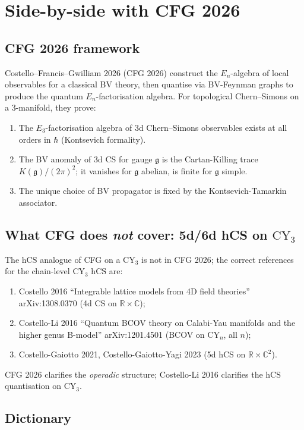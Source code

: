 \documentclass[11pt]{article}
\providecommand{\CY}{\mathrm{CY}}
\providecommand{\hCS}{\mathrm{hCS}}
\providecommand{\fg}{\mathfrak{g}}
\providecommand{\RR}{\mathbb{R}}
\providecommand{\CC}{\mathbb{C}}
\begin{document}
\section{Side-by-side with CFG 2026}
\label{sec:cfg-side-by-side}

\subsection{CFG 2026 framework}

Costello--Francis--Gwilliam 2026 (CFG 2026) construct the $E_n$-algebra
of local observables for a classical BV theory, then quantise via
BV-Feynman graphs to produce the quantum $E_n$-factorisation algebra.
For topological Chern--Simons on a 3-manifold, they prove:
\begin{enumerate}
\item The $E_3$-factorisation algebra of 3d Chern--Simons observables
exists at all orders in $\hbar$ (Kontsevich formality).
\item The BV anomaly of 3d CS for gauge $\fg$ is the Cartan-Killing
trace $K(\fg)/(2\pi)^2$; it vanishes for $\fg$ abelian, is finite for
$\fg$ simple.
\item The unique choice of BV propagator is fixed by the
Kontsevich-Tamarkin associator.
\end{enumerate}

\subsection{What CFG does \emph{not} cover: 5d/6d hCS on $\CY_3$}

The $\hCS$ analogue of CFG on a $\CY_3$ is not in CFG 2026; the
correct references for the chain-level $\CY_3$ $\hCS$ are:
\begin{enumerate}
\item Costello 2016 ``Integrable lattice models from 4D field theories''
arXiv:1308.0370 (4d CS on $\RR \times \CC$);
\item Costello-Li 2016 ``Quantum BCOV theory on Calabi-Yau manifolds and
the higher genus B-model'' arXiv:1201.4501 (BCOV on $\CY_n$, all $n$);
\item Costello-Gaiotto 2021, Costello-Gaiotto-Yagi 2023 (5d hCS on
$\RR \times \CC^2$).
\end{enumerate}
CFG 2026 clarifies the \emph{operadic} structure; Costello-Li 2016 clarifies
the $\hCS$ quantisation on $\CY_3$.

\subsection{Dictionary}
\end{document}
